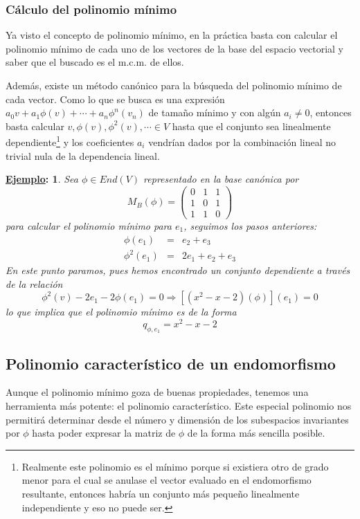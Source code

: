 \documentclass[10pt,a4paper,openright]{book}
\theoremstyle{break}
\newtheorem*{ej}{\underline{Ejemplo}:}
\begin{document}
\subsubsection{Cálculo del polinomio mínimo}
Ya visto el concepto de polinomio mínimo, en la práctica basta con calcular el polinomio mínimo de cada uno de los vectores de la base del espacio vectorial y saber que el buscado es el m.c.m. de ellos.

Además, existe un método canónico para la búsqueda del polinomio mínimo de cada vector. Como lo que se busca es una expresión $a_0v + a_1\phi(v) + \cdots + a_n\phi^n(v_n)$ de tamaño mínimo y con algún $a_i\neq 0$, entonces basta calcular $v,\phi(v), \phi^2(v), \cdots \in V$ hasta que el conjunto sea linealmente dependiente\footnote{Realmente este polinomio es el mínimo porque si existiera otro de grado menor para el cual se anulase el vector evaluado en el endomorfismo resultante, entonces habría un conjunto más pequeño linealmente independiente y eso no puede ser.} y los coeficientes $a_i$ vendrían dados por la combinación lineal no trivial nula de la dependencia lineal.

\begin{ej}
Sea $\phi\in End(V)$ representado en la base canónica por
$$
M_B(\phi)=\begin{pmatrix} 0&1&1\\1&0&1\\1&1&0\end{pmatrix}
$$
para calcular el polinomio mínimo para $e_1$, seguimos los pasos anteriores:
\begin{eqnarray*}
\phi(e_1) &=& e_2+e_3  \\
\phi^2(e_1) &=& 2e_1+e_2+e_3
\end{eqnarray*}
En este punto paramos, pues hemos encontrado un conjunto dependiente a través de la relación
$$
\phi^2(v)-2e_1-2\phi(e_1)=0 \Rightarrow [(x^2-x-2)(\phi)](e_1)=0
$$
lo que implica que el polinomio mínimo es de la forma
$$
q_{\phi,e_1}=x^2-x-2
$$
\end{ej}

\subsection{Polinomio característico de un endomorfismo}
Aunque el polinomio mínimo goza de buenas propiedades, tenemos una herramienta más potente: el  polinomio característico. Este especial polinomio nos permitirá determinar desde el número y dimensión de los subespacios invariantes por $\phi$ hasta poder expresar la matriz de $\phi$ de la forma más sencilla posible.
\end{document}
